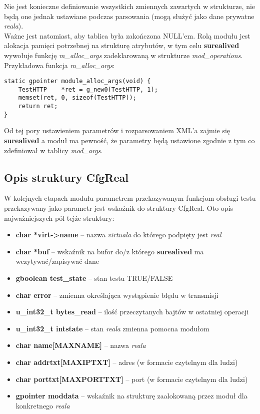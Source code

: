 \documentclass[polish,12pt]{article}
\begin{document}
Nie jest konieczne definiowanie wszystkich zmiennych zawartych w strukturze,
nie będą one jednak ustawiane podczas parsowania (mogą służyć jako dane prywatne \textit{reala}).\\
Ważne jest natomiast, aby tablica była zakończona NULL'em.
\newline
Rolą modułu jest alokacja pamięci potrzebnej na strukturę atrybutów, w tym celu \textbf{surealived}
wywołuje funkcję \textit{m\_alloc\_args} zadeklarowaną w strukturze \textit{mod\_operations}.
Przykładowa funkcja \textit{m\_alloc\_args}:
{\small
\begin{verbatim}
static gpointer module_alloc_args(void) {
    TestHTTP    *ret = g_new0(TestHTTP, 1);
    memset(ret, 0, sizeof(TestHTTP));
    return ret;
}
\end{verbatim}
}
Od tej pory ustawieniem parametrów i rozparsowaniem XML'a zajmie się \textbf{surealived}
a moduł ma pewność, że parametry będą ustawione zgodnie z tym co zdefiniował w tablicy
\textit{mod\_args}.

\subsection{Opis struktury CfgReal}
W kolejnych etapach modułu parametrem przekazywanym funkcjom obsługi testu przekazywany
jako parametr jest wskaźnik do struktury CfgReal. Oto opis najważniejszych pól tejże struktury:
\begin{itemize}
  \item \textbf{char *virt->name} -- nazwa \textit{virtuala} do którego podpięty jest \textit{real}
  \item \textbf{char *buf} -- wskaźnik na bufor do/z którego \textbf{surealived} ma wczytywać/zapisywać dane
  \item \textbf{gboolean test\_state} -- stan testu TRUE/FALSE
  \item \textbf{char error} -- zmienna określająca wystąpienie błędu w transmisji
  \item \textbf{u\_int32\_t bytes\_read} -- ilość przeczytanych bajtów w ostatniej operacji
  \item \textbf{u\_int32\_t intstate} -- stan \textit{reala} zmienna pomocna modułom
  \item \textbf{char name[MAXNAME]} -- nazwa \textit{reala}
  \item \textbf{char addrtxt[MAXIPTXT]} -- adres (w formacie czytelnym dla ludzi)
  \item \textbf{char porttxt[MAXPORTTXT]} -- port (w formacie czytelnym dla ludzi)
  \item \textbf{gpointer moddata} -- wskaźnik na strukturę zaalokowaną przez moduł dla konkretnego
    \textit{reala}
\end{itemize}
\end{document}
